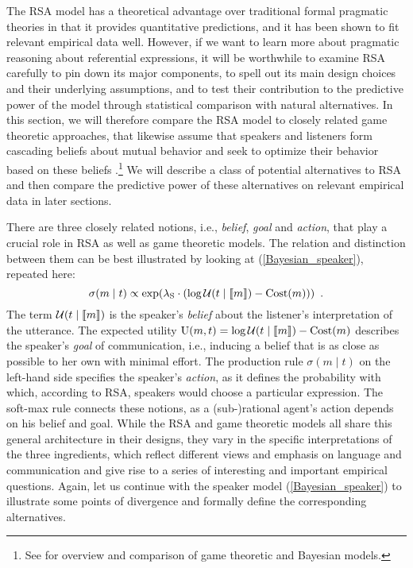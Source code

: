 The RSA model has a theoretical advantage over traditional formal
pragmatic theories in that it provides quantitative predictions, and
it has been shown to fit relevant empirical data well. However, if we
want to learn more about pragmatic reasoning about referential
expressions, it will be worthwhile to examine RSA carefully to pin
down its major components, to spell out its main design choices and
their underlying assumptions, and to test their contribution to the
predictive power of the model through statistical comparison with
natural alternatives. In this section, we will therefore compare the
RSA model to closely related game theoretic approaches, that likewise
assume that speakers and listeners form cascading beliefs about mutual behavior
and seek to optimize their behavior based on these beliefs
\cite{Rabin1990:Communication-b,Stalnaker:SayingMeaningCredibility,BenzvanRooijOptimalAssertions2007,Franke2011:Quantity-Implic,Jager2013:Rationalizable-}.\footnote{See
\cite{FrankeJager2013:Pragmatic-Back-} for overview and comparison
of game theoretic and Bayesian models.} We will describe a class of potential 
alternatives to RSA and then compare the predictive power of these alternatives 
on relevant empirical data in later sections.

There are three closely related notions, i.e., \emph{belief},
\emph{goal} and \emph{action}, that play a crucial role in RSA as well
as game theoretic models. The relation and distinction between them
can be best illustrated by looking at (\ref{Bayesian_speaker}),
repeated here:
$$\sigma(m \mid t) \propto \exp(\lambda_\mathrm{S} \cdot (\log \mathcal{U}(t\mid \llbracket m \rrbracket)-\mbox{Cost}(m))) \enspace .$$
The term $\mathcal{U}(t\mid \llbracket m \rrbracket)$ is the speaker's \emph{belief}
about the listener's interpretation of the utterance. The expected
utility $\mbox{U}(m,t)=\log \mathcal{U}(t\mid
\llbracket m \rrbracket)-\mbox{Cost}(m)$ describes the speaker's \emph{goal} of
communication, i.e., inducing a belief that is as close as possible to
her own with minimal effort. The production rule $\sigma(m \mid t)$ on
the left-hand side specifies the speaker's \emph{action}, as it
defines the probability with which, according to RSA, speakers would
choose a particular expression. The soft-max rule connects these
notions, as a (sub-)rational agent's action depends on his belief and
goal. While the RSA and game theoretic models all share this general
architecture in their designs, they vary in the specific
interpretations of the three ingredients, which reflect different
views and emphasis on language and communication and give rise to a
series of interesting and important empirical questions. Again, let us
continue with the speaker model (\ref{Bayesian_speaker}) to illustrate
some points of divergence and formally define the corresponding
alternatives.

